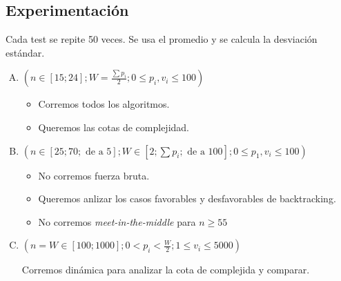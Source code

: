 \documentclass[fleqn, 11pt]{article}
\begin{document}
\subsection{Experimentación}

Cada test se repite 50 veces. Se usa el promedio y se calcula la desviación
estándar.

\begin{enumerate}[A.]
\item $(n \in [15; 24];
	W=\frac{\sum p_i}{2};
	0 \leq p_i, v_i \leq 100)$

\begin{itemize}
\item Corremos todos los algoritmos.
\item Queremos las cotas de complejidad.
\end{itemize}

\item $(n \in [25; 70; \text{ de a } 5];
	W \in [2; \sum p_i; \text{ de a } 100];
	0 \leq p_1, v_i \leq 100)$

\begin{itemize}
\item No corremos fuerza bruta.
\item Queremos anlizar los casos favorables y desfavorables de backtracking.
\item No corremos \emph{meet-in-the-middle} para $n \geq 55$
\end{itemize}

\item $(n = W \in [100; 1000];
        0 < p_i < \frac{W}{2};
        1 \leq v_i \leq 5000)$

Corremos dinámica para analizar la cota de complejida y comparar.
\end{enumerate}
\end{document}
